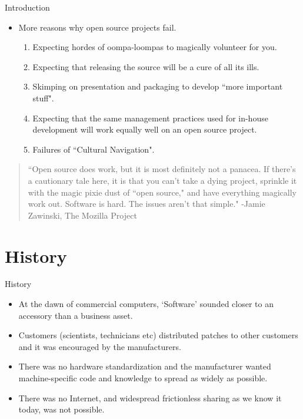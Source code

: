\documentclass{beamer}
\begin{document}
\begin{frame}{Introduction}
	\begin{itemize}
	\item More reasons why open source projects fail.
	\begin{enumerate}
		\item Expecting hordes of oompa-loompas to magically volunteer for you.
		\item Expecting that releasing the source will be a cure of all its ills.
		\item Skimping on presentation and packaging to develop ``more important stuff".
		\item Expecting that the same management practices used for in-house development will work equally well on an open source project.
		\item Failures of ``Cultural Navigation".
	\end{enumerate}
	\end{itemize}
\begin{quote}
\tiny{``Open source does work, but it is most definitely not a panacea. If there's a cautionary tale here, it is that you can't take a dying project, sprinkle it with the magic pixie dust of ``open source," and have everything magically work out. Software is hard. The issues aren't that simple."
-Jamie Zawinski,  The Mozilla Project}
\end{quote}
\end{frame}

\section{History}

\begin{frame}{History}
\begin{itemize}
	\item At the dawn of commercial computers, `Software' sounded closer to an accessory than a business asset. 
	\item Customers (scientists, technicians etc) distributed patches to other customers and it was encouraged by the manufacturers. 
	\item There was no hardware standardization and the manufacturer wanted machine-specific code and knowledge to spread as widely as possible. 
	\item There was no Internet, and widespread frictionless sharing as we know it today, was not possible.
\end{itemize}
\end{frame}
\end{document}
